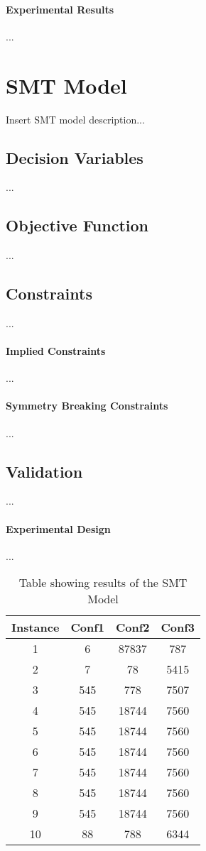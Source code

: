 \documentclass{article}
\begin{document}
\paragraph{Experimental Results}
...

\section{SMT Model}
Insert SMT model description...
\subsection{Decision Variables}
...
\subsection{Objective Function}
...
\subsection{Constraints}
...
\paragraph{Implied Constraints}
...
\paragraph{Symmetry Breaking Constraints}
...
\subsection{Validation}
...
\paragraph{Experimental Design}
...
\begin{table}[h!]
\centering
\begin{tabular}{|c | c c c|} 
 \hline
 Instance & Conf1 & Conf2 & Conf3\\ [0.5ex] 
 \hline\hline
 1 & 6 & 87837 & 787 \\ 
 2 & 7 & 78 & 5415 \\
 3 & 545 & 778 & 7507 \\
 4 & 545 & 18744 & 7560 \\
 5 & 545 & 18744 & 7560 \\
 6 & 545 & 18744 & 7560 \\
 7 & 545 & 18744 & 7560 \\
 8 & 545 & 18744 & 7560 \\
 9 & 545 & 18744 & 7560 \\
 10 & 88 & 788 & 6344 \\ [1ex] 
 \hline
\end{tabular}
\caption{Table showing results of the SMT Model}
\label{table:1}
\end{table}
\end{document}
